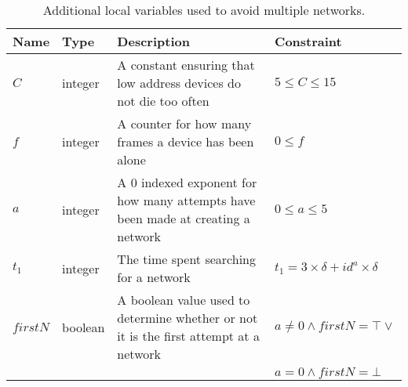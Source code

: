 \begin{table}[h]
    {\setlength{\extrarowheight}{1ex}%
    \begin{tabularx}{\textwidth}{l|l|X|l}
        \toprule
        Name                & Type      & Description & Constraint \\
        \midrule
        $C$                 & integer   & A constant ensuring that low address devices do not die too often                 & $5 \leq C \leq 15$      \\
        $f$                 & integer   & A counter for how many frames a device has been alone                             & $0 \leq f$  \\
        $a$                 & integer   & A 0 indexed exponent for how many attempts have been made at creating a network   & $0 \leq a \leq 5$     \\
        $t_1$               & integer   & The time spent searching for a network                                            & $t_1 = 3 \times \delta + id^a \times \delta$     \\
        $firstN$            & boolean   & A boolean value used to determine whether or not it is the first attempt at a network         & $a \neq 0 \land firstN = \top \lor$     \\
                            &           &                                                                                   & $a = 0 \land firstN = \bot$     \\

        \bottomrule
    \end{tabularx}}
    \caption{Additional local variables used to avoid multiple networks.}
    \label{tab:locals_wmulticonnect}
\end{table}
